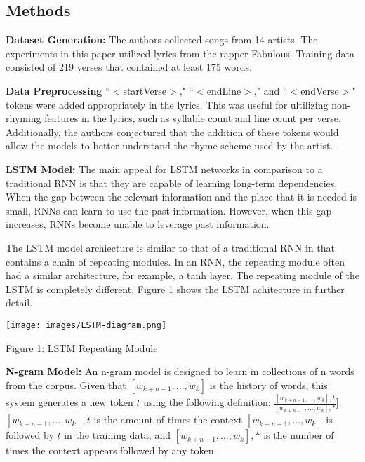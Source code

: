 \documentclass{article}
\begin{document}
\begin{item}
\section{Methods}
\item \textbf{Dataset Generation:} The authors collected songs from 14 artists. The experiments in this paper utilized lyrics from the rapper Fabulous. Training data consisted of 219 verses that contained at least 175 words. 

\item \textbf{Data Preprocessing} ``$<$startVerse$>$," ``$<$endLine$>$," and ``$<$endVerse$>$" tokens were added appropriately in the lyrics. This was useful for ultilizing non-rhyming features in the lyrics, such as syllable count and line count per verse. Additionally, the authors conjectured that the addition of these tokens would allow the models to better understand the rhyme scheme used by the artist. 

\item \textbf{LSTM Model:} 
The main appeal for LSTM networks in comparison to a traditional RNN is that they are capable of learning long-term dependencies. When the gap between the relevant information and the place that it is needed is small, RNNs can learn to use the past information. However, when this gap increases, RNNs become unable to leverage past information. 

The LSTM model archiecture is similar to that of a traditional RNN in that contains a chain of repeating modules. In an RNN, the repeating module often had a similar architecture, for example, a tanh layer. The repeating module of the LSTM is completely different. Figure 1 shows the LSTM achitecture in further detail.

\texttt{[image: images/LSTM-diagram.png]}

\centering \caption{Figure 1: LSTM Repeating Module}

\item \textbf{N-gram Model:}  
An n-gram model is designed to learn in collections of n words from the corpus. Given that $[w_{k+n-1},..., w_{k}]$ is the history of words, this system generates a new token $t$ using the following definition:
$\frac{[w_{k+n-1},..., w_{k}], t}{[w_{k+n-1},..., w_{k}], *}$]. $[w_{k+n-1},..., w_{k}], t$ is the amount of times the context $[w_{k+n-1},..., w_{k}]$ is followed by $t$ in the training data, and $[w_{k+n-1},..., w_{k}], *$ is the number of times the context appears followed by any token. 

\end{item}
\end{document}
